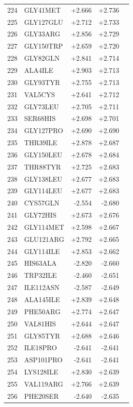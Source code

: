 \begin{longtable}{r l r r c}
224 & GLY41MET & +2.666 & +2.736 &  \\
225 & GLY127GLU & +2.712 & +2.733 &  \\
226 & GLY33ARG & +2.856 & +2.729 &  \\
227 & GLY150TRP & +2.659 & +2.720 &  \\
228 & GLY82GLN & +2.841 & +2.714 &  \\
229 & ALA4ILE & +2.903 & +2.713 &  \\
230 & GLY93TYR & +2.755 & +2.713 &  \\
231 & VAL5CYS & +2.641 & +2.712 &  \\
232 & GLY73LEU & +2.705 & +2.711 &  \\
233 & SER68HIS & +2.698 & +2.701 &  \\
234 & GLY127PRO & +2.690 & +2.690 &  \\
235 & THR39ILE & +2.878 & +2.687 &  \\
236 & GLY150LEU & +2.678 & +2.684 &  \\
237 & THR88TYR & +2.725 & +2.683 &  \\
238 & GLY138LEU & +2.677 & +2.683 &  \\
239 & GLY114LEU & +2.677 & +2.683 &  \\
240 & CYS57GLN & -2.554 & -2.680 &  \\
241 & GLY72HIS & +2.673 & +2.676 &  \\
242 & GLY114MET & +2.598 & +2.667 &  \\
243 & GLU121ARG & +2.792 & +2.665 &  \\
244 & GLY114ILE & +2.853 & +2.662 &  \\
245 & HIS63ALA & -2.820 & -2.660 &  \\
246 & TRP32ILE & -2.460 & -2.651 &  \\
247 & ILE112ASN & -2.587 & -2.649 &  \\
248 & ALA145ILE & +2.839 & +2.648 &  \\
249 & PHE50ARG & +2.774 & +2.647 &  \\
250 & VAL81HIS & +2.644 & +2.647 &  \\
251 & GLY85TYR & +2.688 & +2.646 &  \\
252 & ILE18PRO & -2.641 & -2.641 &  \\
253 & ASP101PRO & -2.641 & -2.641 &  \\
254 & LYS128ILE & +2.830 & +2.639 &  \\
255 & VAL119ARG & +2.766 & +2.639 &  \\
256 & PHE20SER & -2.640 & -2.635 &  \\

\end{longtable}

